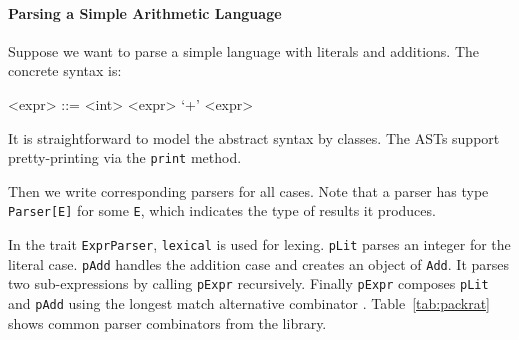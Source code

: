 \paragraph{Parsing a Simple Arithmetic Language}
Suppose we want to parse a simple language with literals and
additions. The concrete syntax is:

\setlength{\grammarindent}{5em}
\begin{grammar}
<expr> ::= <int>
    \alt <expr> `+' <expr>
\end{grammar}

It is straightforward to model the abstract syntax by classes. The ASTs support pretty-printing via the \lstinline{print} method.


Then we write corresponding parsers for all cases.
Note that a parser has type \lstinline{Parser[E]} for some
\lstinline{E}, which indicates the type of results it produces.


In the trait \lstinline{ExprParser}, \lstinline{lexical} is used for lexing. \lstinline{pLit} parses an integer for the literal case.
\lstinline{pAdd} handles the addition case and creates an object of \lstinline{Add}. It parses two sub-expressions by calling \lstinline{pExpr}
recursively. Finally \lstinline{pExpr} composes \lstinline{pLit} and \lstinline{pAdd} using the longest match alternative combinator \inlinecode{|||}.
Table~\ref{tab:packrat} shows common parser combinators from the library.

